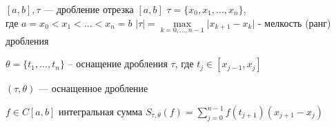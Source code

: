 \begin{definition}
    $[a, b], \tau $ --- дробление отрезка $[a, b]$ $\tau = \{ x_0, x_1, ..., x_n \}$, \\
     где $a = x_0 < x_1 < ... < x_n = b$ \quad $|\tau| 
     = \underset{k = 0, \dots , n - 1}{\max} \lvert x_{k + 1} - x_k \rvert$ - мелкость (ранг) дробления

    $\theta = \{ t_1, ..., t_n\}$ -- оснащение дробления $\tau$, где $t_j \in [x_{j - 1}, x_j]$

    $(\tau, \theta) $ --- оснащенное дробление

    $f \in C[a, b]$ интегральная сумма $S_{\tau, \theta} (f) = \sum_{j = 0}^{n - 1} f(t_{j + 1}) (x_{j + 1} - x_j)$
\end{definition}



\quad


 

